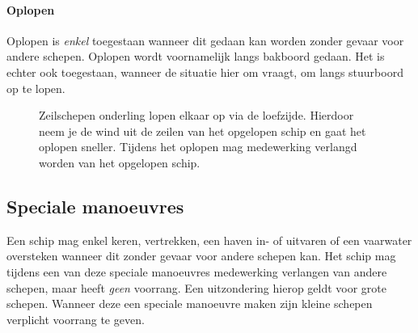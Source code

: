 \paragraph{Oplopen}
Oplopen is \textit{enkel} toegestaan wanneer dit gedaan kan worden zonder gevaar voor andere schepen. Oplopen wordt voornamelijk langs bakboord gedaan. Het is echter ook toegestaan, wanneer de situatie hier om vraagt, om langs stuurboord op te lopen.



\begin{figure}[H]
	\centering
	\begin{minipage}[t]{0.70\textwidth}
	Zeilschepen onderling lopen elkaar op via de loefzijde. Hierdoor neem je de wind uit de zeilen van het opgelopen schip en gaat het oplopen sneller. Tijdens het oplopen mag medewerking verlangd worden van het opgelopen schip.
	\end{minipage}
	\hfill
	\begin{minipage}[t]{0.25\textwidth}
		\label{pic:op}
	\end{minipage}
	\hfill
\end{figure}

\subsection{Speciale manoeuvres}
Een schip mag enkel keren, vertrekken, een haven in- of uitvaren of een vaarwater oversteken wanneer dit zonder gevaar voor andere schepen kan. Het schip mag tijdens een van deze speciale manoeuvres medewerking verlangen van andere schepen, maar heeft \textit{geen} voorrang. Een uitzondering hierop geldt voor grote schepen. Wanneer deze een speciale manoeuvre maken zijn kleine schepen verplicht voorrang te geven.

